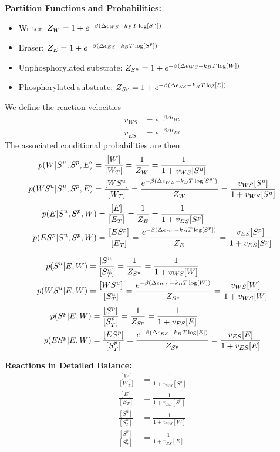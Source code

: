 \documentclass[aps,onecolumn,superscriptaddress,notitlepage]{revtex4-1}
\begin{document}
\textbf{Partition Functions and Probabilities:}
\begin{itemize}
\item Writer: $Z_W = 1 + e^{-\beta\qty(\Delta\epsilon_{WS} -k_BT \log[S^u])}$
\item Eraser: $Z_E = 1 + e^{-\beta\qty(\Delta\epsilon_{ES} -k_BT \log[S^p])}$
\item Unphosphorylated substrate: $Z_{S^u} = 1 + e^{-\beta\qty(\Delta\epsilon_{WS} -k_BT \log[W])}$
\item Phosphorylated substrate: $Z_{S^p} = 1 + e^{-\beta\qty(\Delta\epsilon_{ES} -k_BT \log[E])}$
\end{itemize}
We define the reaction velocities
\begin{align}
v_{WS} &= e^{-\beta\Delta\epsilon_{WS}}\\
v_{ES} &= e^{-\beta\Delta\epsilon_{ES}}
\end{align}
The associated conditional probabilities are then
\begin{align}
p(W|S^u,S^p, E) &= \frac{[W]}{[W_T]} = \frac{1}{Z_W} =  \frac{1}{1 + v_{WS}[S^u]}\\
p(WS^u|S^u,S^p, E) &= \frac{[WS^u]}{[W_T]}  = \frac{e^{-\beta\qty(\Delta\epsilon_{WS} -k_BT \log[S^u])}}{Z_W} =  \frac{v_{WS}[S^u]}{1 + v_{WS}[S^u]}
\end{align}
\begin{align}
p(E|S^u,S^p, W) &= \frac{[E]}{[E_T]} = \frac{1}{Z_E} =  \frac{1}{1 + v_{ES}[S^p]}\\
p(ES^p|S^u,S^p, W) &= \frac{[ES^p]}{[E_T]}  = \frac{e^{-\beta\qty(\Delta\epsilon_{ES} -k_BT \log[S^p])}}{Z_E} =  \frac{v_{ES}[S^p]}{1 + v_{ES}[S^p]}
\end{align}

\begin{align}
p(S^u|E, W) &= \frac{[S^u]}{[S^u_T]} = \frac{1}{Z_{S^u}} = \frac{1}{1 + v_{WS}[W]}\\
p(WS^u|E, W) &= \frac{[WS^u]}{[S^u_T]} = \frac{ e^{-\beta\qty(\Delta\epsilon_{WS} -k_BT \log[W])}}{Z_{S^u}} = \frac{v_{WS}[W]}{1 + v_{WS}[W]}
\end{align}
\begin{align}
p(S^p|E, W) &= \frac{[S^p]}{[S^p_T]} = \frac{1}{Z_{S^p}} = \frac{1}{1 + v_{ES}[E]}\\
p(ES^p|E, W) &= \frac{[ES^p]}{[S^p_T]} = \frac{ e^{-\beta\qty(\Delta\epsilon_{ES} -k_BT \log[E])}}{Z_{S^p}} = \frac{v_{ES}[E]}{1 + v_{ES}[E]}
\end{align}

\textbf{Reactions in Detailed Balance:}
\begin{align}
\frac{[W]}{[W_T]} & = \frac{1}{1 + v_{WS}[S^u]}\\
\frac{[E]}{[E_T]} & = \frac{1}{1 + v_{ES}[S^p]}\\
\frac{[S^u]}{[S^u_T]} &= \frac{1}{1 + v_{WS}[W]}\\
\frac{[S^p]}{[S^p_T]} &=  \frac{1}{1 + v_{ES}[E]}
\end{align}
\end{document}
